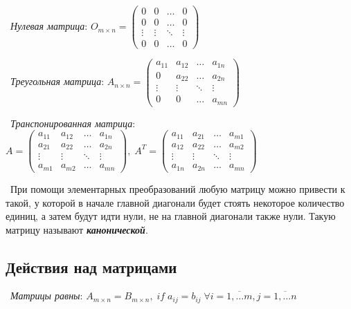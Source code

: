 \smallskip
\noindent \textasteriskcentered~\textit{Нулевая матрица}:
$O_{m \times n} = 
\begin{pmatrix}
    0 & 0 & \dots & 0 \\
    0 & 0 & \dots & 0 \\
    \vdots & \vdots & \ddots & \vdots \\
    0 & 0 & \dots & 0
\end{pmatrix}
$

\smallskip
\noindent \textasteriskcentered~\textit{Треугольная матрица}:
$A_{n \times n} = 
\begin{pmatrix}
    a_{11} & a_{12} & \dots & a_{1n} \\
    0 & a_{22} & \dots & a_{2n} \\
    \vdots & \vdots & \ddots & \vdots \\
    0 & 0 & \dots & a_{mn}
\end{pmatrix}$

\smallskip
\noindent \textasteriskcentered~\textit{Транспонированная матрица}:
$A = 
\begin{pmatrix}
    a_{11} & a_{12} & \dots & a_{1n} \\
    a_{21} & a_{22} & \dots & a_{2n} \\
    \vdots & \vdots & \ddots & \vdots \\
    a_{m1} & a_{m2} & \dots & a_{mn}
\end{pmatrix},\;
A^T = 
\begin{pmatrix}
    a_{11} & a_{21} & \dots & a_{m1} \\
    a_{12} & a_{22} & \dots & a_{m2} \\
    \vdots & \vdots & \ddots & \vdots \\
    a_{1n} & a_{2n} & \dots & a_{mn}
\end{pmatrix}$

\medskip
\noindent \textasteriskcentered~При помощи элементарных преобразований любую матрицу можно привести к такой, у которой в начале главной диагонали будет стоять некоторое количество единиц, а затем будут идти нули, не на главной диагонали также нули. Такую матрицу называют \textbf{\textit{канонической}}.

\subsection*{Действия над матрицами}

\noindent \textasteriskcentered~\textit{Матрицы равны}: $A_{m \times n} = B_{m \times n}, \; if \; a_{ij} = b_{ij} 
\;\forall i = \overline{1,\dots m}, j = \overline{1, \dots n}$


